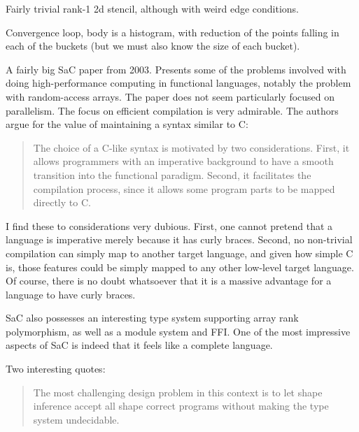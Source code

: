 \documentclass[a4paper, oneside, final]{memoir}
\begin{document}
\begin{description}
\item[HotSpot] Fairly trivial rank-1 2d stencil, although with weird
  edge conditions.
\item[Kmeans] Convergence loop, body is a histogram, with reduction of
  the points falling in each of the buckets (but we must also know the
  size of each bucket).
\item
\end{description}

\begin{quote}
\end{quote}

A fairly big SaC paper from 2003.  Presents some of the problems
involved with doing high-performance computing in functional
languages, notably the problem with random-access arrays.  The paper
does not seem particularly focused on parallelism.  The focus on
efficient compilation is very admirable.  The authors argue for the
value of maintaining a syntax similar to C:

\begin{quote}
  The choice of a C-like syntax is motivated by two
  considerations. First, it allows programmers with an imperative
  background to have a smooth transition into the functional
  paradigm. Second, it facilitates the compilation process, since it
  allows some program parts to be mapped directly to C.
\end{quote}

I find these to considerations very dubious.  First, one cannot
pretend that a language is imperative merely because it has curly
braces.  Second, no non-trivial compilation can simply map to another
target language, and given how simple C is, those features could be
simply mapped to any other low-level target language.  Of course,
there is no doubt whatsoever that it is a massive advantage for a
language to have curly braces.

SaC also possesses an interesting type system supporting array rank
polymorphism, as well as a module system and FFI.  One of the most
impressive aspects of SaC is indeed that it feels like a complete
language.

Two interesting quotes:

\begin{quote}
  The most challenging design problem in this context is to let shape
  inference accept all shape correct programs without making the type
  system undecidable.
\end{quote}
\end{document}
